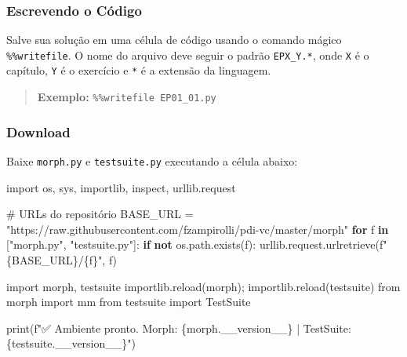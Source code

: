 \documentclass[
  portuguese,
  letterpaper,
  openany,
  oneside,
  12pt,
  a4paper]{book}
\newenvironment{Shaded}{\begin{snugshade}}{\end{snugshade}}
\newcommand{\BuiltInTok}[1]{\textcolor[rgb]{0.00,0.23,0.31}{#1}}
\newcommand{\CommentTok}[1]{\textcolor[rgb]{0.37,0.37,0.37}{#1}}
\newcommand{\ControlFlowTok}[1]{\textcolor[rgb]{0.00,0.23,0.31}{\textbf{#1}}}
\newcommand{\ImportTok}[1]{\textcolor[rgb]{0.00,0.46,0.62}{#1}}
\newcommand{\KeywordTok}[1]{\textcolor[rgb]{0.00,0.23,0.31}{\textbf{#1}}}
\newcommand{\NormalTok}[1]{\textcolor[rgb]{0.00,0.23,0.31}{#1}}
\newcommand{\OperatorTok}[1]{\textcolor[rgb]{0.37,0.37,0.37}{#1}}
\newcommand{\SpecialCharTok}[1]{\textcolor[rgb]{0.37,0.37,0.37}{#1}}
\newcommand{\SpecialStringTok}[1]{\textcolor[rgb]{0.13,0.47,0.30}{#1}}
\newcommand{\StringTok}[1]{\textcolor[rgb]{0.13,0.47,0.30}{#1}}
\begin{document}
\subsubsection*{Escrevendo o Código}\label{escrevendo-o-cuxf3digo}

Salve sua solução em uma célula de código usando o comando mágico
\texttt{\%\%writefile}. O nome do arquivo deve seguir o padrão
\texttt{EPX\_Y.*}, onde \texttt{X} é o capítulo, \texttt{Y} é o
exercício e \texttt{*} é a extensão da linguagem.

\begin{quote}
\textbf{Exemplo:} \texttt{\%\%writefile\ EP01\_01.py}
\end{quote}

\subsubsection*{Download}\label{download}

Baixe \texttt{morph.py} e \texttt{testsuite.py} executando a célula
abaixo:

\begin{Shaded}
\begin{Highlighting}[]
\ImportTok{import}\NormalTok{ os, sys, importlib, inspect, urllib.request}

\CommentTok{\# URLs do repositório}
\NormalTok{BASE\_URL }\OperatorTok{=} \StringTok{"https://raw.githubusercontent.com/fzampirolli/pdi{-}vc/master/morph"}
\ControlFlowTok{for}\NormalTok{ f }\KeywordTok{in}\NormalTok{ [}\StringTok{"morph.py"}\NormalTok{, }\StringTok{"testsuite.py"}\NormalTok{]:}
    \ControlFlowTok{if} \KeywordTok{not}\NormalTok{ os.path.exists(f):}
\NormalTok{        urllib.request.urlretrieve(}\SpecialStringTok{f"}\SpecialCharTok{\{}\NormalTok{BASE\_URL}\SpecialCharTok{\}}\SpecialStringTok{/}\SpecialCharTok{\{}\NormalTok{f}\SpecialCharTok{\}}\SpecialStringTok{"}\NormalTok{, f)}

\ImportTok{import}\NormalTok{ morph, testsuite}
\NormalTok{importlib.}\BuiltInTok{reload}\NormalTok{(morph)}\OperatorTok{;}\NormalTok{ importlib.}\BuiltInTok{reload}\NormalTok{(testsuite)}
\ImportTok{from}\NormalTok{ morph }\ImportTok{import}\NormalTok{ mm}
\ImportTok{from}\NormalTok{ testsuite }\ImportTok{import}\NormalTok{ TestSuite}

\BuiltInTok{print}\NormalTok{(}\SpecialStringTok{f"✅ Ambiente pronto. Morph: }\SpecialCharTok{\{}\NormalTok{morph}\SpecialCharTok{.}\NormalTok{\_\_version\_\_}\SpecialCharTok{\}}\SpecialStringTok{ | TestSuite: }\SpecialCharTok{\{}\NormalTok{testsuite}\SpecialCharTok{.}\NormalTok{\_\_version\_\_}\SpecialCharTok{\}}\SpecialStringTok{"}\NormalTok{)}
\end{Highlighting}
\end{Shaded}
\end{document}
